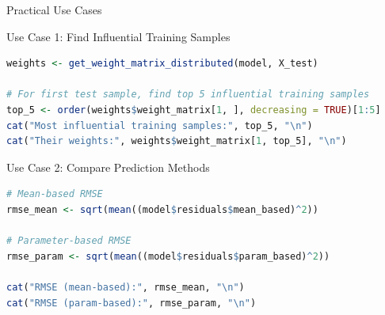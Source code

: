 \documentclass[aspectratio=169]{beamer}
\begin{document}
\begin{frame}[fragile]{Practical Use Cases}

\begin{block}{Use Case 1: Find Influential Training Samples}
\end{block}

\begin{lstlisting}[language=R, basicstyle=\tiny\ttfamily]
weights <- get_weight_matrix_distributed(model, X_test)

# For first test sample, find top 5 influential training samples
top_5 <- order(weights$weight_matrix[1, ], decreasing = TRUE)[1:5]
cat("Most influential training samples:", top_5, "\n")
cat("Their weights:", weights$weight_matrix[1, top_5], "\n")
\end{lstlisting}

\vspace{0.3cm}

\begin{block}{Use Case 2: Compare Prediction Methods}
\end{block}

\begin{lstlisting}[language=R, basicstyle=\tiny\ttfamily]
# Mean-based RMSE
rmse_mean <- sqrt(mean((model$residuals$mean_based)^2))

# Parameter-based RMSE
rmse_param <- sqrt(mean((model$residuals$param_based)^2))

cat("RMSE (mean-based):", rmse_mean, "\n")
cat("RMSE (param-based):", rmse_param, "\n")
\end{lstlisting}

\end{frame}
\end{document}
